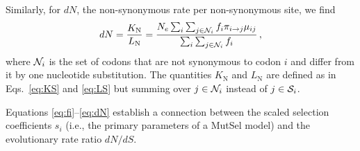 \documentclass[11pt]{article}
\begin{document}
Similarly, for $dN$, the non-synonymous rate per non-synonymous site, we find
\begin{equation}\label{eq:dN}
  dN = \frac{K_\text{N}}{L_\text{N}}=\frac{ N_e \sum_i \sum_{j \in {\cal N}_i} f_i  \pi_{i\rightarrow j}\mu_{ij}}{\sum_i \sum_{j \in {\cal N}_i} f_i}\,,
\end{equation}
where ${\cal N}_i$ is the set of codons that are not synonymous to codon $i$ and differ from it by one nucleotide substitution. The quantities $K_\text{N}$ and $L_\text{N}$ are defined as in Eqs.~\eqref{eq:KS} and \eqref{eq:LS} but summing over $j\in {\cal N}_i$ instead of $j\in {\cal S}_i$.

Equations \eqref{eq:fi}--\eqref{eq:dN} establish a connection between the scaled selection coefficients $s_i$ (i.e., the primary parameters of a MutSel model) and the evolutionary rate ratio $dN/dS$.

	
	
	
	
	
	
	
	
	
\newpage

	
	
\end{document}
